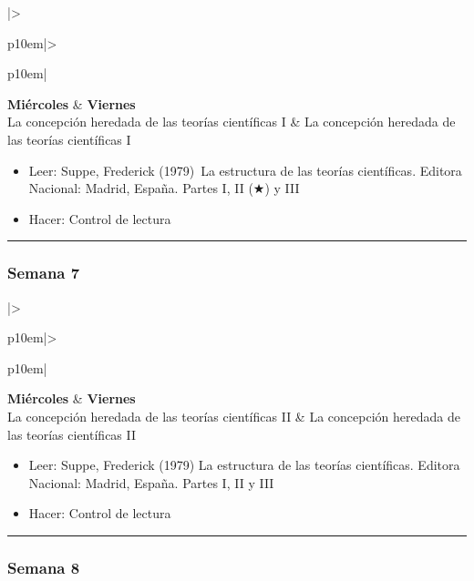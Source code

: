\documentclass[spanish,]{article}
\begin{document}
\begin{tabular}{|>{\raggedright\arraybackslash}p{10em}|>{\raggedright\arraybackslash}p{10em}|}
\hline
\textbf{Miércoles} & \textbf{Viernes}\\
\hline
La concepción heredada de las teorías científicas I & La concepción heredada de las teorías científicas I\\
\hline
\end{tabular}

\begin{itemize}
\item
  Leer: Suppe, Frederick (1979)~La estructura de las teorías
  científicas. Editora Nacional: Madrid, España. Partes I, II (★) y III
\item
  Hacer: Control de lectura
\end{itemize}

\begin{center}\rule{0.5\linewidth}{\linethickness}\end{center}

\subsubsection{Semana 7}\label{semana-7}

\begin{tabular}{|>{\raggedright\arraybackslash}p{10em}|>{\raggedright\arraybackslash}p{10em}|}
\hline
\textbf{Miércoles} & \textbf{Viernes}\\
\hline
La concepción heredada de las teorías científicas II & La concepción heredada de las teorías científicas II\\
\hline
\end{tabular}

\begin{itemize}
\item
  Leer: Suppe, Frederick (1979) La estructura de las teorías
  científicas. Editora Nacional: Madrid, España. Partes I, II y III
\item
  Hacer: Control de lectura
\end{itemize}

\begin{center}\rule{0.5\linewidth}{\linethickness}\end{center}

\subsubsection{Semana 8}\label{semana-8}
\end{document}
